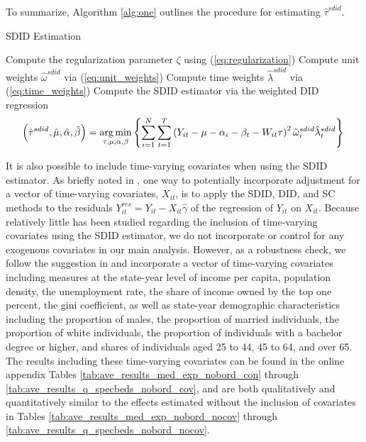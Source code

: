 \documentclass[../Main.tex]{subfiles}
\begin{document}
To summarize, Algorithm \ref{alg:one} outlines the procedure for estimating $\hat{\tau}^{sdid}$.
\vspace{.25cm}
\begin{center}
\begin{algorithm}[H]
\caption{SDID Estimation}\label{alg:one}
Compute the regularization parameter $\zeta$ using (\ref{eq:regularization})\;
Compute unit weights $\hat{\omega}^{sdid}$ via (\ref{eq:unit_weights})\;
Compute time weights $\hat{\lambda}^{sdid}$ via (\ref{eq:time_weights})\;
Compute the SDID estimator via the weighted DID regression
\begin{equation*}
    \left(\hat{\tau}^{sdid},\hat{\mu},\hat{\alpha},\hat{\beta}\right)=\operatorname*{arg\,min}_{\tau,\mu,\alpha,\beta}\left\{\sum_{i=1}^N\sum_{t=1}^T\left(Y_{it}-\mu-\alpha_i-\beta_t-W_{it}\tau\right)^2\hat{\omega}_i^{sdid}\hat{\lambda}_t^{sdid}\right\}\;
\end{equation*}
\end{algorithm}
\end{center}
$~$\\
\indent It is also possible to include time-varying covariates when using the SDID estimator. As briefly noted in \citet{arkhangelsky2021synthetic}, one way to potentially incorporate adjustment for a vector of time-varying covariates, $X_{it}$, is to apply the SDID, DID, and SC methods to the residuals $Y_{it}^{res}=Y_{it}-X_{it}\hat{\gamma}$ of the regression of $Y_{it}$ on $X_{it}$. Because relatively little has been studied regarding the inclusion of time-varying covariates using the SDID estimator, we do not incorporate or control for any exogenous covariates in our main analysis. However, as a robustness check, we follow the suggestion in \citet{arkhangelsky2021synthetic} and incorporate a vector of time-varying covariates including measures at the state-year level of income per capita, population density, the unemployment rate, the share of income owned by the top one percent, the gini coefficient, as well as state-year demographic characteristics including the proportion of males, the proportion of married individuals, the proportion of white individuals, the proportion of individuals with a bachelor degree or higher, and shares of individuals aged 25 to 44, 45 to 64, and over 65. The results including these time-varying covariates can be found in the online appendix Tables \ref*{tab:ave_results_med_exp_nobord_con} through \ref*{tab:ave_results_q_specbeds_nobord_cov}, and are both qualitatively and quantitatively similar to the effects estimated without the inclusion of covariates in Tables \ref{tab:ave_results_med_exp_nobord_nocov} through \ref{tab:ave_results_q_specbeds_nobord_nocov}.
\end{document}
